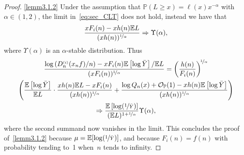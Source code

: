 \documentclass[10pt]{amsart}
\theoremstyle{definition}\newtheorem{defi}[theo]{Definition}\newtheorem{rema}[theo]{Remark}\newtheorem{exam}[theo]{Example}\newtheorem{exem}[theo]{Example}\newtheorem{nota}[theo]{Notation}
\newcommand{\sss}{\ensuremath{\scriptscriptstyle}}
\newcommand{\Op}{{\mathcal O_{\bbP}}}
\newcommand{\bbP}{\mathbb{P}}
\newcommand{\bbE}{\mathbb{E}}
\begin{document}
\begin{proof}
\eqref{lemm3.1.2} Under the assumption that $\bbP(L\geq x)=\ell(x)x^{-\alpha}$ with $\alpha\in (1, 2)$, the limit in~\eqref{eq:sec_CLT} does not hold, instead we have that
\[
\frac{xF_i(n)-xh(n)\bbE L}{(xh(n))^{\nicefrac1\alpha}}
\Rightarrow \Upsilon(\alpha),
\]
where $\Upsilon(\alpha)$ is an $\alpha$-stable distribution. Thus
\begin{multline*}
\frac{\log \left(D_n^{\sss (i)}(x_nf)/n\right)-xF_i(n)\bbE\left[\log \bar Y\right]/\bbE L}{(xF_i(n))^{\nicefrac1\alpha}}=
\left(\frac{h(n)}{F_i(n)}\right)^{\!\nicefrac1\alpha}\\
\left(\frac{\bbE\left[\log \bar Y\right]}{\bbE L}\cdot \frac{xh(n)\bbE L - xF_i(n)}{(xh(n))^{\nicefrac1\alpha}} + \frac{\log Q_n(x) +\Op(1) - xh(n)\bbE\left[\log\bar Y\right]}{(xh(n))^{\nicefrac1\alpha}}\right)\\
\Rightarrow \frac{\bbE\left[\log(\nicefrac1{\bar Y})\right]}{(\bbE L)^{1+\nicefrac1\alpha}}\Upsilon(\alpha),
\end{multline*}
where the second summand now vanishes in the limit. This concludes the proof of~\eqref{lemm3.1.2} because $\mu = \bbE[\log(\nicefrac1{\bar Y})]$, and because $F_i(n) = f(n)$ with probability tending to~1 when~$n$ tends to infinity.
\end{proof}
\end{document}

